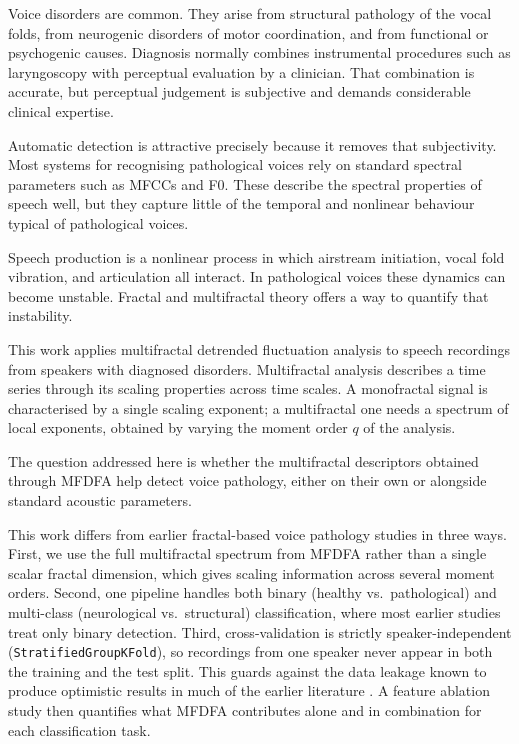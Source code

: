 \documentclass[runningheads]{llncs}
\begin{document}
Voice disorders are common. They arise from structural pathology of the vocal folds, from neurogenic disorders of motor coordination, and from functional or psychogenic causes. Diagnosis normally combines instrumental procedures such as laryngoscopy with perceptual evaluation by a clinician. That combination is accurate, but perceptual judgement is subjective and demands considerable clinical expertise.

Automatic detection is attractive precisely because it removes that subjectivity. Most systems for recognising pathological voices rely on standard spectral parameters such as MFCCs and F0. These describe the spectral properties of speech well, but they capture little of the temporal and nonlinear behaviour typical of pathological voices.

Speech production is a nonlinear process in which airstream initiation, vocal fold vibration, and articulation all interact. In pathological voices these dynamics can become unstable. Fractal and multifractal theory offers a way to quantify that instability.

This work applies multifractal detrended fluctuation analysis to speech recordings from speakers with diagnosed disorders. Multifractal analysis describes a time series through its scaling properties across time scales. A monofractal signal is characterised by a single scaling exponent; a multifractal one needs a spectrum of local exponents, obtained by varying the moment order $q$ of the analysis.

The question addressed here is whether the multifractal descriptors obtained through MFDFA help detect voice pathology, either on their own or alongside standard acoustic parameters.

  This work differs from earlier fractal-based voice pathology studies in three ways. First, we use the full multifractal spectrum from MFDFA rather than a single scalar fractal dimension, which gives scaling information across several moment orders. Second, one pipeline handles both binary (healthy vs.\ pathological) and multi-class (neurological vs.\ structural) classification, where most earlier studies treat only binary detection. Third, cross-validation is strictly speaker-independent (\texttt{StratifiedGroupKFold}), so recordings from one speaker never appear in both the training and the test split. This guards against the data leakage known to produce optimistic results in much of the earlier literature \cite{saenzlechon2006}. A feature ablation study then quantifies what MFDFA contributes alone and in combination for each classification task.
\end{document}
